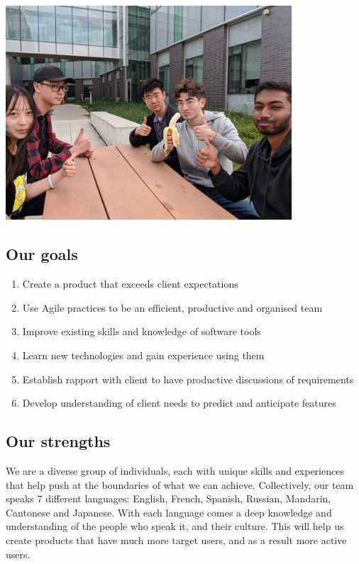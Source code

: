 \documentclass[12pt]{scrreprt}
\begin{document}
\begin{center}
	\includegraphics[width=0.8\textwidth]{food2.jpg}
\end{center}

\subsection{Our goals}
\begin{enumerate}
	\item Create a product that exceeds client expectations
	\item Use Agile practices to be an efficient, productive and organised team
	\item Improve existing skills and knowledge of software tools
	\item Learn new technologies and gain experience using them
	\item Establish rapport with client to have productive discussions of requirements
	\item Develop understanding of client needs to predict and anticipate features
\end{enumerate}

\subsection{Our strengths}
We are a diverse group of individuals, each with unique skills and experiences that help push at the boundaries of what we can achieve. Collectively, our team speaks 7 different languages: English, French, Spanish, Russian, Mandarin, Cantonese and Japanese. With each language comes a deep knowledge and understanding of the people who speak it, and their culture. This will help us create products that have much more target users, and as a result more active users.
\end{document}
